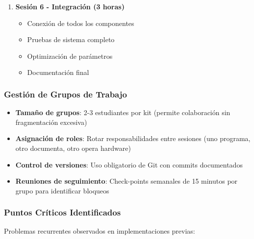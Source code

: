 \begin{enumerate}
    \item \textbf{Sesión 6 - Integración (3 horas)}
    \begin{itemize}
        \item Conexión de todos los componentes
        \item Pruebas de sistema completo
        \item Optimización de parámetros
        \item Documentación final
    \end{itemize}
\end{enumerate}

\subsubsection{Gestión de Grupos de Trabajo}

\begin{itemize}
    \item \textbf{Tamaño de grupos}: 2-3 estudiantes por kit (permite colaboración sin fragmentación excesiva)
    \item \textbf{Asignación de roles}: Rotar responsabilidades entre sesiones (uno programa, otro documenta, otro opera hardware)
    \item \textbf{Control de versiones}: Uso obligatorio de Git con commits documentados
    \item \textbf{Reuniones de seguimiento}: Check-points semanales de 15 minutos por grupo para identificar bloqueos
\end{itemize}

\subsubsection{Puntos Críticos Identificados}

Problemas recurrentes observados en implementaciones previas:

